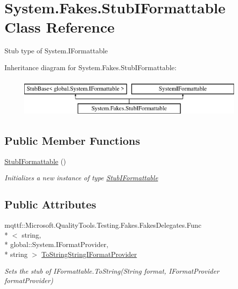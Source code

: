 \hypertarget{class_system_1_1_fakes_1_1_stub_i_formattable}{\section{System.\-Fakes.\-Stub\-I\-Formattable Class Reference}
\label{class_system_1_1_fakes_1_1_stub_i_formattable}
}


Stub type of System.\-I\-Formattable 


Inheritance diagram for System.\-Fakes.\-Stub\-I\-Formattable\-:\begin{figure}[H]
\begin{center}
\leavevmode
\includegraphics[height=2.000000cm]{class_system_1_1_fakes_1_1_stub_i_formattable}
\end{center}
\end{figure}
\subsection*{Public Member Functions}
\begin{DoxyCompactItemize}
\item 
\hyperlink{class_system_1_1_fakes_1_1_stub_i_formattable_acf33141f0d8badc6903bd71c0a6ff060}{Stub\-I\-Formattable} ()
\begin{DoxyCompactList}\small\item\em Initializes a new instance of type \hyperlink{class_system_1_1_fakes_1_1_stub_i_formattable}{Stub\-I\-Formattable}\end{DoxyCompactList}\end{DoxyCompactItemize}
\subsection*{Public Attributes}
\begin{DoxyCompactItemize}
\item 
mqttf\-::\-Microsoft.\-Quality\-Tools.\-Testing.\-Fakes.\-Fakes\-Delegates.\-Func\\*
$<$ string, \\*
global\-::\-System.\-I\-Format\-Provider, \\*
string $>$ \hyperlink{class_system_1_1_fakes_1_1_stub_i_formattable_aa8666e8343d795e9891eeca5a0b2a890}{To\-String\-String\-I\-Format\-Provider}
\begin{DoxyCompactList}\small\item\em Sets the stub of I\-Formattable.\-To\-String(\-String format, I\-Format\-Provider format\-Provider)\end{DoxyCompactList}\end{DoxyCompactItemize}


